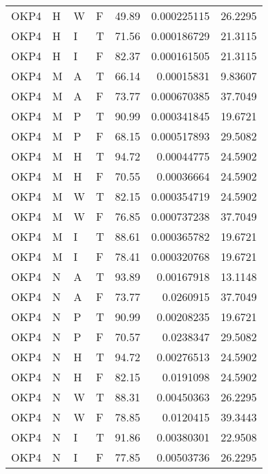 \begin{table}[!htb]
{\begin{tabular}{llllrrr}
            OKP4     & H     & W     & F          & 49.89      & 0.000225115 & 26.2295  \\
            OKP4     & H     & I     & T          & 71.56      & 0.000186729 & 21.3115  \\
            OKP4     & H     & I     & F          & 82.37      & 0.000161505 & 21.3115  \\
            OKP4     & M     & A     & T          & 66.14      & 0.00015831  & 9.83607  \\
            OKP4     & M     & A     & F          & 73.77      & 0.000670385 & 37.7049  \\
            OKP4     & M     & P     & T          & 90.99      & 0.000341845 & 19.6721  \\
            OKP4     & M     & P     & F          & 68.15      & 0.000517893 & 29.5082  \\
            OKP4     & M     & H     & T          & 94.72      & 0.00044775  & 24.5902  \\
            OKP4     & M     & H     & F          & 70.55      & 0.00036664  & 24.5902  \\
            OKP4     & M     & W     & T          & 82.15      & 0.000354719 & 24.5902  \\
            OKP4     & M     & W     & F          & 76.85      & 0.000737238 & 37.7049  \\
            OKP4     & M     & I     & T          & 88.61      & 0.000365782 & 19.6721  \\
            OKP4     & M     & I     & F          & 78.41      & 0.000320768 & 19.6721  \\
            OKP4     & N     & A     & T          & 93.89      & 0.00167918  & 13.1148  \\
            OKP4     & N     & A     & F          & 73.77      & 0.0260915   & 37.7049  \\
            OKP4     & N     & P     & T          & 90.99      & 0.00208235  & 19.6721  \\
            OKP4     & N     & P     & F          & 70.57      & 0.0238347   & 29.5082  \\
            OKP4     & N     & H     & T          & 94.72      & 0.00276513  & 24.5902  \\
            OKP4     & N     & H     & F          & 82.15      & 0.0191098   & 24.5902  \\
            OKP4     & N     & W     & T          & 88.31      & 0.00450363  & 26.2295  \\
            OKP4     & N     & W     & F          & 78.85      & 0.0120415   & 39.3443  \\
            OKP4     & N     & I     & T          & 91.86      & 0.00380301  & 22.9508  \\
            OKP4     & N     & I     & F          & 77.85      & 0.00503736  & 26.2295  \\
            \hline
        \end{tabular}
    }{}
\end{table}